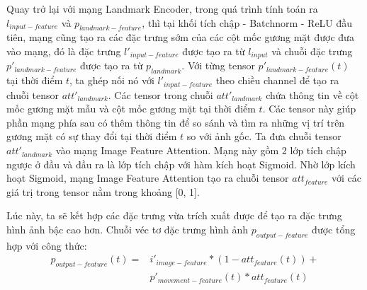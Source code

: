 Quay trở lại với mạng Landmark Encoder, trong quá trình tính toán ra $l_{input-feature}$ và $p_{landmark-feature}$, thì tại khối tích chập - Batchnorm - ReLU đầu tiên, mạng cũng tạo ra các đặc trưng sớm của các cột mốc gương mặt được đưa vào mạng, đó là đặc trưng $l'_{input-feature}$ được tạo ra từ $l_{input}$ và chuỗi đặc trưng $p'_{landmark-feature}$ được tạo ra từ $p_{landmark}$. Với từng tensor $p'_{landmark-feature}(t)$ tại thời điểm $t$, ta ghép nối nó với $l'_{input-feature}$ theo chiều channel để tạo ra chuỗi tensor $att'_{landmark}$. Các tensor trong chuỗi $att'_{landmark}$ chứa thông tin về cột mốc gương mặt mẫu và cột mốc gương mặt tại thời điểm $t$. Các tensor này giúp phần mạng phía sau có thêm thông tin để so sánh và tìm ra những vị trí trên gương mặt có sự thay đổi tại thời điểm $t$ so với ảnh gốc. Ta đưa chuỗi tensor $att'_{landmark}$ vào mạng Image Feature Attention. Mạng này gồm 2 lớp tích chập ngược ở đầu và đầu ra là lớp tích chập với hàm kích hoạt Sigmoid. Nhờ lớp kích hoạt Sigmoid, mạng Image Feature Attention tạo ra chuỗi tensor $att_{feature}$ với các giá trị trong tensor nằm trong khoảng [0, 1]. 

Lúc này, ta sẽ kết hợp các đặc trưng vừa trích xuất được để tạo ra đặc trưng hình ảnh bậc cao hơn. Chuỗi véc tơ đặc trưng hình ảnh $p_{output-feature}$ được tổng hợp với công thức:
\begin{equation}
    \begin{split}
    p_{output-feature}(t) = &i'_{image-feature}*(1-att_{feature}(t))+\\
    &p'_{movement-feature}(t)*att_{feature}(t)
    \end{split}
\end{equation}

